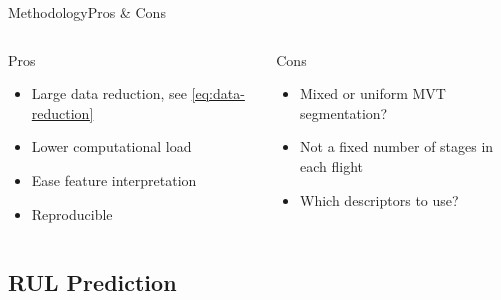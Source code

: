 \documentclass{beamer}
\begin{document}
            \begin{frame}{Methodology}{Pros \& Cons}
                \begin{columns}
                    \begin{column}{0.45\textwidth}
                        \begin{exampleblock}{Pros}
                            \begin{itemize}
                                \item Large data reduction, see \eqref{eq:data-reduction}
                                \item Lower computational load
                                \item Ease feature interpretation
                                \item Reproducible
                            \end{itemize}
                        \end{exampleblock}
                    \end{column}
                    \begin{column}{0.45\textwidth}
                        \begin{alertblock}{Cons}
                            \begin{itemize}
                                \item Mixed or uniform MVT segmentation?
                                \item Not a fixed number of stages in each flight
                                \item Which descriptors to use?
                            \end{itemize}
                        \end{alertblock}
                    \end{column}
                \end{columns}
            \end{frame}

        \subsection{RUL Prediction}
\end{document}
